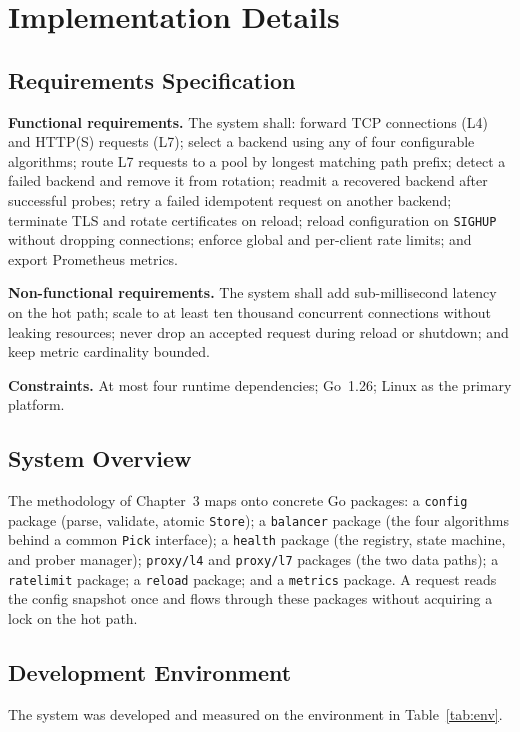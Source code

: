 \documentclass[11pt,a4paper]{report}
\newcommand{\code}[1]{\texttt{#1}}
\begin{document}
\chapter{Implementation Details}

\section{Requirements Specification}
\textbf{Functional requirements.} The system shall: forward TCP connections (L4) and HTTP(S)
requests (L7); select a backend using any of four configurable algorithms; route L7 requests to
a pool by longest matching path prefix; detect a failed backend and remove it from rotation;
readmit a recovered backend after successful probes; retry a failed idempotent request on
another backend; terminate TLS and rotate certificates on reload; reload configuration on
\code{SIGHUP} without dropping connections; enforce global and per-client rate limits; and export
Prometheus metrics.

\textbf{Non-functional requirements.} The system shall add sub-millisecond latency on the hot
path; scale to at least ten thousand concurrent connections without leaking resources; never drop
an accepted request during reload or shutdown; and keep metric cardinality bounded.

\textbf{Constraints.} At most four runtime dependencies; Go~1.26; Linux as the primary platform.

\section{System Overview}
The methodology of Chapter~3 maps onto concrete Go packages: a \code{config} package (parse,
validate, atomic \code{Store}); a \code{balancer} package (the four algorithms behind a common
\code{Pick} interface); a \code{health} package (the registry, state machine, and prober
manager); \code{proxy/l4} and \code{proxy/l7} packages (the two data paths); a \code{ratelimit}
package; a \code{reload} package; and a \code{metrics} package. A request reads the config
snapshot once and flows through these packages without acquiring a lock on the hot path.

\section{Development Environment}
The system was developed and measured on the environment in Table~\ref{tab:env}.
\end{document}
